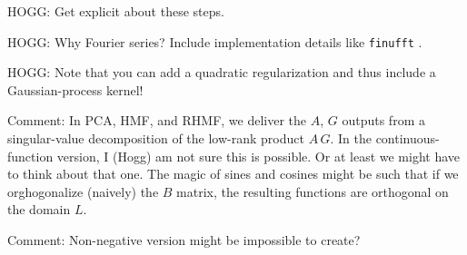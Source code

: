 \documentclass{article}
\begin{document}
HOGG: Get explicit about these steps.

HOGG: Why Fourier series? Include implementation details like \texttt{finufft} \cite{finufft}.

HOGG: Note that you can add a quadratic regularization and thus include a Gaussian-process kernel!

Comment: In PCA, HMF, and RHMF, we deliver the $A$, $G$ outputs from a singular-value decomposition of the low-rank product $A\,G$.
In the continuous-function version, I (Hogg) am not sure this is possible.
Or at least we might have to think about that one.
The magic of sines and cosines might be such that if we orghogonalize (naively) the $B$ matrix, the resulting functions are orthogonal on the domain $L$.

Comment: Non-negative version might be impossible to create?



\end{document}
